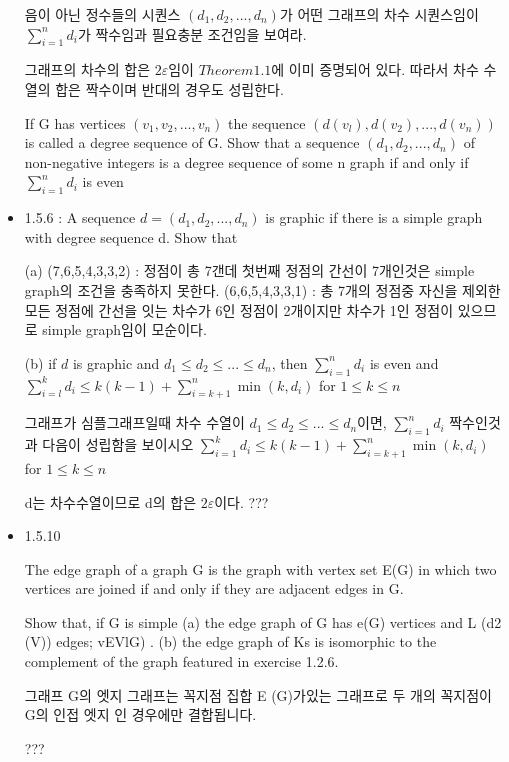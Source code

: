 \documentclass{oblivoir}
\begin{document}
\begin{itemize}
    음이 아닌 정수들의 시퀀스 $(d_1, d_2, ... , d_n)$가 어떤 그래프의 차수 시퀀스임이 $\sum_{i=1}^n d_i$가 짝수임과 필요충분 조건임을 보여라.

    그래프의 차수의 합은 $2\varepsilon$임이  $Theorem1.1$에 이미 증명되어 있다. 따라서 차수 수열의 합은 짝수이며 반대의 경우도 성립한다.
    
    
    If G has vertices $(v_1, v_2, ... , v_n)$ the sequence $(d(v_l), d(v_2), ... , d(v_n))$ is called a degree sequence of G. 
    Show that a sequence $(d_1, d_2, ... , d_n)$ of non-negative integers is a degree sequence of some n
    graph if and only if $\sum_{i=1}^n d_i$ is even

    \item 1.5.6 : A sequence $d = (d_1, d_2 , ... , d_n)$ is graphic if there is a simple graph with degree sequence d. Show that

    (a) (7,6,5,4,3,3,2) : 정점이 총 7갠데 첫번째 정점의 간선이 7개인것은 simple graph의 조건을 충족하지 못한다.
    (6,6,5,4,3,3,1) : 총 7개의 정점중 자신을 제외한 모든 정점에 간선을 잇는 차수가 6인 정점이 2개이지만 차수가 1인 정점이 있으므로  simple graph임이 모순이다.

    (b) if $d$ is graphic and $d_1 \le d_2 \le ... \le d_n$, then $\sum_{i=1}^{n} d_i$ is even and $\sum_{i=l}^{k} d_i \le k(k -1)+\sum_{i=k+1}^{n}\min(k, d_i)$ for $1 \le k \le n$

    그래프가 심플그래프일때 차수 수열이 $d_1 \le d_2 \le ... \le d_n$이면,  $\sum_{i=1}^{n} d_i$ 짝수인것과 다음이 성립함을 보이시오
    $\sum_{i=1}^{k} d_i \le k(k -1)+\sum_{i=k+1}^{n}\min(k, d_i)$ for $1 \le k \le n$
    
    d는 차수수열이므로 d의 합은 $2\varepsilon$이다.
???
    \item 1.5.10
    
    The edge graph of a graph G is the graph with vertex set E(G) in
    which two vertices are joined if and only if they are adjacent edges in G. 
    
    Show that, if G is simple
    (a) the edge graph of G has e(G) vertices and L (d2 (V)) edges; vEVlG) .
    (b) the edge graph of Ks is isomorphic to the complement of the
    graph featured in exercise 1.2.6.

    그래프 G의 엣지 그래프는 꼭지점 집합 E (G)가있는 그래프로 두 개의 꼭지점이 G의 인접 엣지 인 경우에만 결합됩니다.



???




\end{itemize}
\end{document}
